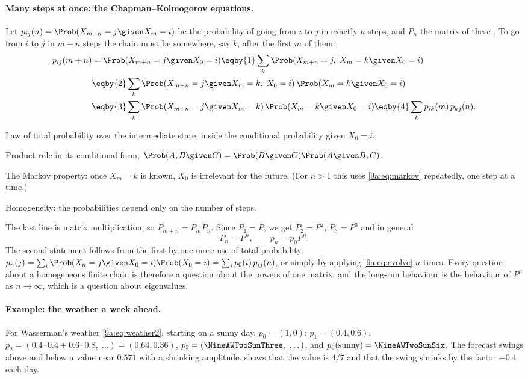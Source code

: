 \paragraph{Many steps at once: the Chapman--Kolmogorov equations.}
Let $p_{ij}(n)=\Prob(X_{m+n}=j\given X_m=i)$ be the probability of going from $i$ to $j$ in
exactly $n$ steps, and $P_n$ the matrix of these 
. To go from $i$ to $j$ in $m+n$ steps the chain must be somewhere, say $k$,
after the first $m$ of them:
\begin{align}
  p_{ij}(m+n)
  &= \Prob(X_{m+n}=j\given X_0=i)
  \eqby{1}\sum_k\Prob(X_{m+n}=j,\;X_m=k\given X_0=i) \nonumber\\
  &\eqby{2}\sum_k\Prob(X_{m+n}=j\given X_m=k,\;X_0=i)\,\Prob(X_m=k\given X_0=i) \nonumber\\
  &\eqby{3}\sum_k\Prob(X_{m+n}=j\given X_m=k)\,\Prob(X_m=k\given X_0=i)
  \eqby{4}\sum_k p_{ik}(m)\,p_{kj}(n).
  \label{9a:eq:chapman}
\end{align}
\begin{explain}
  \item Law of total probability over the intermediate state, inside the conditional
        probability given $X_0=i$.
  \item Product rule in its conditional form,
        $\Prob(A,B\given C)=\Prob(B\given C)\Prob(A\given B,C)$.
  \item The Markov property: once $X_m=k$ is known, $X_0$ is irrelevant for the future. (For
        $n>1$ this uses \eqref{9a:eq:markov} repeatedly, one step at a time.)
  \item Homogeneity: the probabilities depend only on the number of steps.
\end{explain}
The last line is matrix multiplication, so $P_{m+n}=P_mP_n$. Since $P_1=P$, we get
$P_2=P^2$, $P_3=P^3$ and in general
\begin{equation}
  P_n=P^n,\qquad p_n=p_0P^n .
  \label{9a:eq:pn}
\end{equation}
The second statement follows from the first by one more use of total probability,
$p_n(j)=\sum_i\Prob(X_n=j\given X_0=i)\Prob(X_0=i)=\sum_ip_0(i)\,p_{ij}(n)$, or simply by
applying \eqref{9a:eq:evolve} $n$ times. Every question about a homogeneous finite chain is
therefore a question about the powers of one matrix, and the long-run behaviour is the
behaviour of $P^n$ as $n\to\infty$, which is a question about eigenvalues.

\paragraph{Example: the weather a week ahead.}
For Wasserman's weather \eqref{9a:eq:weather2}, starting on a sunny day, $p_0=(1,0)$:
$p_1=(0.4,0.6)$, $p_2=(0.4\cdot0.4+0.6\cdot0.8,\;\dots)=(0.64,0.36)$,
$p_3=(\NineAWTwoSunThree,\ \dots)$, and $p_6(\text{sunny})=\NineAWTwoSunSix$. The forecast
swings above and below a value near $0.571$ with a shrinking amplitude. 
shows that the value is $4/7$ and that the swing shrinks by the factor $-0.4$ each day.

